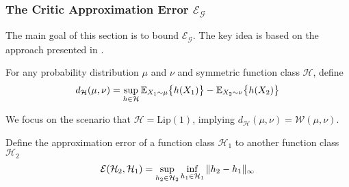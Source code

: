 
\subsubsection{The Critic Approximation Error \texorpdfstring{$\mathcal{E}_{\mathcal{G}}$}{EG}}
The main goal of this section is to bound $\mathcal{E}_{\mathcal{G}}$. The key idea is based on the approach presented in \citep{liu2021non}.
\begin{definition}
    For any probability distribution $\mu$ and $\nu$ and symmetric function class $\mathcal{H}$, define
    \begin{align*}
        d_{\mathcal{H}}(\mu, \nu) = \sup_{h \in \mathcal{H}}\mathbb{E}_{X_1\sim\mu}\big\{h(X_1)\big\} - \mathbb{E}_{X_2 \sim \nu}\big\{h(X_2)\big\}
    \end{align*}
    \begin{remark}
         We focus on the scenario that $\mathcal{H} = \mathrm{Lip}(1)$, implying $d_\mathcal{H}(\mu, \nu) = \mathcal{W}(\mu,\nu)$.
    \end{remark}
\end{definition}

\begin{definition}
    Define the approximation error of a function class $\mathcal{H}_1$ to another function class $\mathcal{H}_2$
    \begin{align*}
        \mathcal{E}(\mathcal{H}_2, \mathcal{H}_1) = \sup_{h_2 \in \mathcal{H}_2}\inf_{h_1 \in \mathcal{H}_1}\Vert{h_2 - h_1}\Vert_\infty
    \end{align*}
\end{definition}

